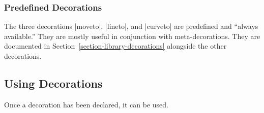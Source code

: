 \subsubsection{Predefined Decorations}

The three decorations |moveto|, |lineto|, and |curveto| are predefined
and ``always available.'' They are mostly useful in conjunction with
meta-decorations. They are documented in
Section~\ref{section-library-decorations} alongside the other
decorations.



\subsection{Using Decorations}

Once a decoration has been declared, it can be used. 

